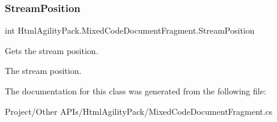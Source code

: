 \subsubsection{\texorpdfstring{Stream\+Position}{StreamPosition}}
{\footnotesize\ttfamily int Html\+Agility\+Pack.\+Mixed\+Code\+Document\+Fragment.\+Stream\+Position\hspace{0.3cm}{\ttfamily [get]}}



Gets the stream position. 

The stream position.

The documentation for this class was generated from the following file\+:\begin{DoxyCompactItemize}
\item 
Project/\+Other A\+P\+Is/\+Html\+Agility\+Pack/Mixed\+Code\+Document\+Fragment.\+cs\end{DoxyCompactItemize}

